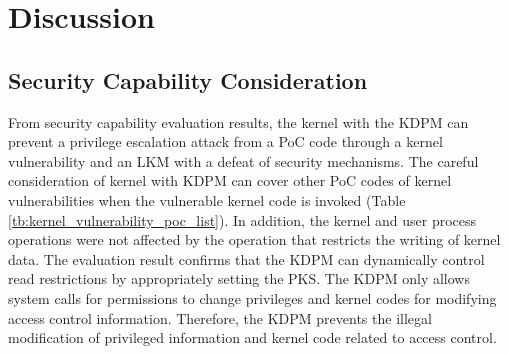 \section{Discussion}  \label{section:discussion}
\subsection{Security Capability Consideration}
From security capability evaluation results, the kernel with the KDPM
can prevent a privilege escalation attack from a PoC code through 
a kernel vulnerability and an LKM with a defeat of security mechanisms.
%
The careful consideration of kernel with KDPM can cover other PoC codes of
kernel vulnerabilities when the vulnerable kernel code is invoked
(Table \ref{tb:kernel_vulnerability_poc_list}).
%
%
%
%
In addition, the kernel and user process operations were not affected by the
operation that restricts the writing of kernel data.
%
The evaluation result confirms that the KDPM can
dynamically control read restrictions by appropriately setting the PKS.
%
The KDPM only allows system calls for permissions to change privileges
and kernel codes for modifying access control information.
%
Therefore, the KDPM prevents the illegal modification of privileged information
and kernel code related to access control.

